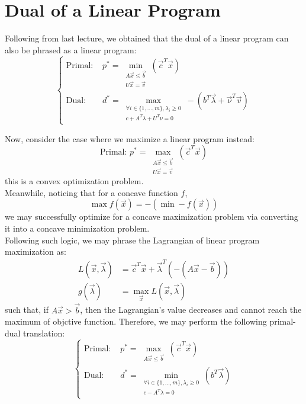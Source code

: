 \section{Dual of a Linear Program}
Following from last lecture, we obtained that the dual of a linear program can also be phrased as a linear program:
\[
    \begin{cases}
        \text{Primal: } &p^* = \underset{
            \substack{
                A \vec{x} \leq \vec{b} \\
                U \vec{x} = \vec{v}
            }
        }{\min} (\vec{c}^T \vec{x}) \\
        \text{Dual: } &d^* = \underset{
            \substack{
                \forall i \in \{1, \dots, m\}, \lambda_i \geq 0 \\
                c + A^T \lambda + U^T \nu = 0
            }
        }{\max} -(b^T \vec{\lambda} + \vec{\nu}^T \vec{v})
    \end{cases}
\]

Now, consider the case where we maximize a linear program instead:
\[
    \text{Primal: } p^* = \max_{
            \substack{
                A \vec{x} \leq \vec{b} \\
                U \vec{x} = \vec{v}
            }
        } (\vec{c}^T \vec{x})
\]
this is a convex optimization problem. \\
Meanwhile, noticing that for a concave function $f$,
\[
    \max f(\vec{x}) = -(\min - f(\vec{x}))
\]
we may successfully optimize for a concave maximization problem via converting it into a concave minimization problem. \\
Following such logic, we may phrase the Lagrangian of linear program maximization as:
\begin{align*}
    L(\vec{x}, \vec{\lambda}) &= \vec{c}^T \vec{x} + \vec{\lambda}^T (- (A\vec{x} - \vec{b})) \\
    g(\vec{\lambda}) &= \max_{\vec{x}} L(\vec{x}, \vec{\lambda})
\end{align*}
such that, if $A \vec{x} > \vec{b}$, then the Lagrangian's value decreases and cannot reach the maximum of objctive function.
Therefore, we may perform the following primal-dual translation:
\[
    \begin{cases}
        \text{Primal: } &p^* = \underset{
            \substack{
                A \vec{x} \leq \vec{b}
            }
        }{\max} (\vec{c}^T \vec{x}) \\
        \text{Dual: } &d^* = \underset{
            \substack{
                \forall i \in \{1, \dots, m\}, \lambda_i \geq 0 \\
                c - A^T \lambda = 0
            }
        }{\min} (b^T \vec{\lambda})
    \end{cases}
\]

